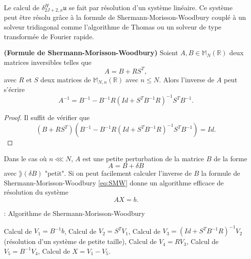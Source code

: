 Le calcul de $\delta_{2J+2,x}^H \mathfrak{u}$ se fait par résolution d'un système linéaire. Ce système peut être résolu grâce à la formule de Shermann-Morisson-Woodbury couplé à un solveur tridiagonal comme l'algorithme de Thomas ou un solveur de type transformée de Fourier rapide.

\begin{proposition}
\textbf{(Formule de Shermann-Morisson-Woodbury)} Soient $A, B \in \mathbb{M}_N \left(\mathbb{R} \right)$ deux matrices inversibles telles que 
\begin{equation}
A = B + R S^T,
\end{equation}
avec $R$ et $S$ deux matrices de $\mathbb{M}_{N,n} \left(\mathbb{R} \right)$ avec $n \leq N$.
Alors l'inverse de $A$ peut s'écrire
\begin{equation}
A^{-1} = B^{-1} - B^{-1} R \left( Id + S^T B^{-1} R  \right)^{-1} S^T B^{-1}.
\label{eq:SMW}
\end{equation}
\end{proposition}

\begin{proof}
Il suffit de vérifier que 
\begin{equation}
\left( B + R S^T \right) \left( B^{-1} - B^{-1} R \left( Id + S^T B^{-1} R  \right)^{-1} S^T B^{-1} \right) = Id.
\end{equation}
\end{proof}

Dans le cas où $n \lll N$, $A$ est une petite perturbation de la matrice $B$ de la forme 
\begin{equation}
A = B + \delta B
\end{equation}
avec $\rang  (\delta B) $ "petit". Si on peut facilement calculer l'inverse de $B$ la formule de Shermann-Morisson-Woodbury \eqref{eq:SMW} donne un algorithme efficace de résolution du système
\begin{equation}
A X = b.
\end{equation} 

\begin{center}
\begin{minipage}[H]{12cm}
  \begin{algorithm}[H]
    \caption{: Algorithme de Shermann-Morisson-Woodbury}\label{alg:SMW}
    \begin{algorithmic}[1]
	\State Calcul de $V_1 = B^{-1} b$,
	\State Calcul de $V_2 = S^T V_1$,
	\State Calcul de $V_3 = (Id + S^T B^{-1}R)^{-1} V_2$ (résolution d'un système de petite taille),
	\State Calcul de $V_4 = R V_3$,
	\State Calcul de $V_5 = B^{-1} V_4$,
	\State Calcul de $X = V_1 - V_5$.
    \end{algorithmic}
    \end{algorithm}
\end{minipage}
\end{center}


